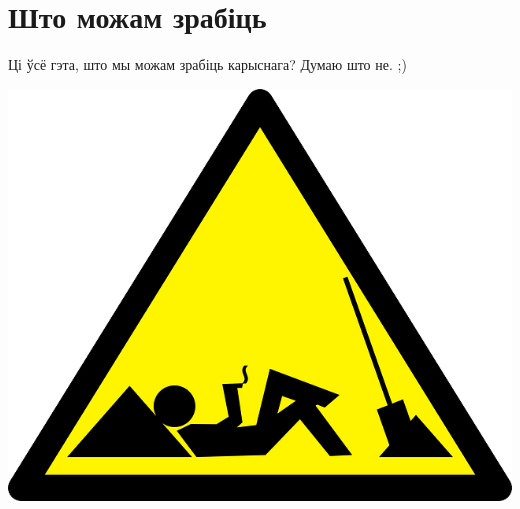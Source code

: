 \documentclass[ignorenonframetext,hyperref={pdftex,unicode}]{beamer}
\begin{document}
\section{Што можам зрабіць}
\begin{frame}{Ці ўсё гэта, што мы можам зрабіць карыснага?} 
	Думаю што не. ;)
	\begin{center}
 		\includegraphics[height=.8\textheight,keepaspectratio]{work-47200_640} 
	\end{center}
\end{frame} %
\end{document}
